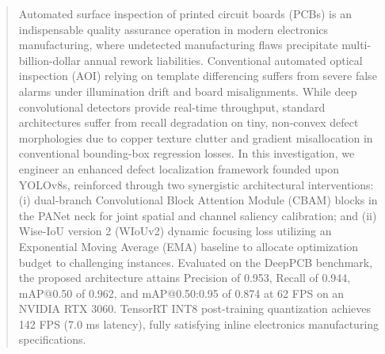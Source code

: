 \documentclass{llncs}
\begin{document}
\begin{abstract}
Automated surface inspection of printed circuit boards (PCBs) is an indispensable quality assurance operation in modern electronics manufacturing, where undetected manufacturing flaws precipitate multi-billion-dollar annual rework liabilities. Conventional automated optical inspection (AOI) relying on template differencing suffers from severe false alarms under illumination drift and board misalignments. While deep convolutional detectors provide real-time throughput, standard architectures suffer from recall degradation on tiny, non-convex defect morphologies due to copper texture clutter and gradient misallocation in conventional bounding-box regression losses. In this investigation, we engineer an enhanced defect localization framework founded upon YOLOv8s, reinforced through two synergistic architectural interventions: (i) dual-branch Convolutional Block Attention Module (CBAM) blocks in the PANet neck for joint spatial and channel saliency calibration; and (ii) Wise-IoU version 2 (WIoUv2) dynamic focusing loss utilizing an Exponential Moving Average (EMA) baseline to allocate optimization budget to challenging instances. Evaluated on the DeepPCB benchmark, the proposed architecture attains Precision of 0.953, Recall of 0.944, mAP@0.50 of 0.962, and mAP@0.50:0.95 of 0.874 at 62 FPS on an NVIDIA RTX 3060. TensorRT INT8 post-training quantization achieves 142 FPS (7.0 ms latency), fully satisfying inline electronics manufacturing specifications.

\end{abstract}

\end{document}
